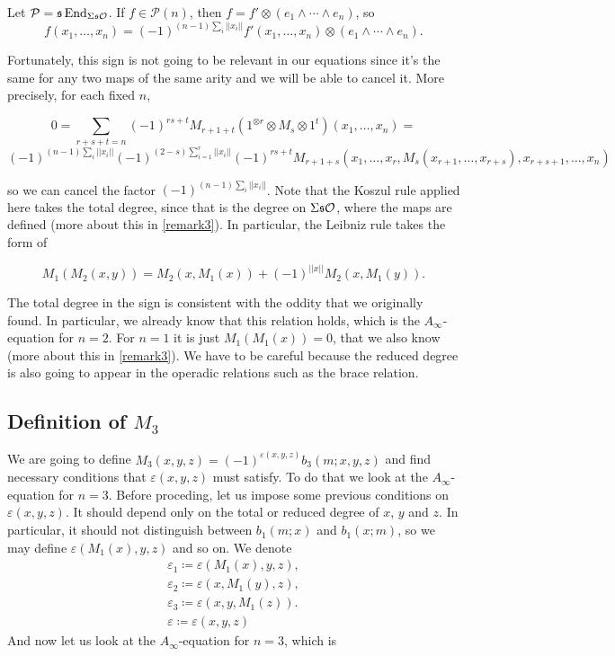 \documentclass[twoside]{article}
\begin{document}
\begin{remark}
Let $\mathcal{P}=\mathfrak{s}\operatorname{End}_{\Sigma\mathfrak{s}{\mathcal O}}$.  If $f\in\mathcal{P}(n)$, then $f=f'\otimes (e_1\land\cdots\land e_n)$, so $$f(x_1,\dots,x_n)=(-1)^{(n-1)\sum_i ||x_i||}f'(x_1,\dots,x_n)\otimes(e_1\land\cdots\land e_n).$$

Fortunately, this sign is not going to be relevant in our equations since it's the same for any two maps of the same arity and we will be able to cancel it. More precisely, for each fixed $n$,

$$0=\sum_{r+s+t=n}(-1)^{rs+t}M_{r+1+t}(1^{\otimes r}\otimes M_s\otimes 1^{t})(x_1,\dots, x_n)=$$
$$(-1)^{(n-1)\sum_i||x_i||}(-1)^{(2-s)\sum_{i=1}^r||x_i||}(-1)^{rs+t}M_{r+1+s}(x_1,\dots, x_r, M_s(x_{r+1},\dots, x_{r+s}), x_{r+s+1},\dots, x_n)$$

so we can cancel the factor $(-1)^{(n-1)\sum_i||x_i||}$. Note that the Koszul rule applied here takes the total degree, since that is the degree on $\Sigma\mathfrak{s}{\mathcal O}$, where the maps are defined (more about this in \ref{remark3}). In particular, the Leibniz rule takes the form of

$$M_1(M_2(x,y))=M_2(x, M_1(x))+(-1)^{||x||}M_2(x,M_1(y)).$$

The total degree in the sign is consistent with the oddity that we originally found. In particular, we already know that this relation holds, which is the $A_\infty$-equation for $n=2$. For $n=1$ it is just $M_1(M_1(x))=0$, that we also know (more about this in \ref{remark3}). We have to be careful because the reduced degree is also going to appear in the operadic relations such as the brace relation.
\end{remark}
\subsection{Definition of $M_3$}
We are going to define $M_3(x,y,z)=(-1)^{\varepsilon(x,y,z)}b_3(m;x,y,z)$ and find necessary conditions that $\varepsilon(x,y,z)$ must satisfy. To do that we look at the $A_\infty$-equation for $n=3$. Before proceding, let us impose some previous conditions on $\varepsilon(x,y,z)$. It should depend only on the total or reduced degree of $x$, $y$ and $z$. In particular, it should not distinguish between $b_1(m;x)$ and $b_1(x;m)$, so we may define $\varepsilon(M_1(x),y,z)$ and so on. We denote 
\begin{gather*}
\varepsilon_1\coloneqq\varepsilon(M_1(x),y,z),\\
\varepsilon_2\coloneqq\varepsilon(x,M_1(y),z),\\
\varepsilon_3\coloneqq\varepsilon(x,y,M_1(z)).\\
\varepsilon\coloneqq\varepsilon(x,y,z)
\end{gather*}
And now let us look at the $A_\infty$-equation for $n=3$, which is
\end{document}

